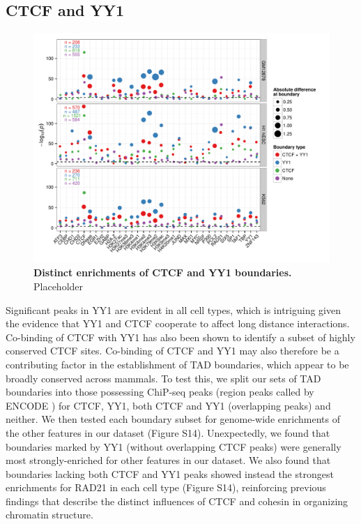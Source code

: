 \documentclass[a4paper,10pt,oneside]{book}
\begin{document}
\subsection{CTCF and YY1}

\begin{figure}
\begin{center} 
\includegraphics[width=1.2\textwidth]{figs/ctcfyy1.pdf}
\captionsetup{width=\textwidth}
\caption{ {\bf Distinct enrichments of CTCF and YY1 boundaries.}
Placeholder
}\label{fig:ctcfyy1}
\end{center}
\end{figure} 

Significant peaks in YY1 are evident in all cell
types, which is intriguing given the evidence that YY1 and CTCF
cooperate to affect long distance interactions.\cite{Atchison2014} Co-binding of CTCF with YY1 has also been shown
to identify a subset of highly conserved CTCF sites.\cite{Schwalie2013} Co-binding of CTCF and YY1 may also therefore be
a contributing factor in the establishment of TAD boundaries, which
appear to be broadly conserved across mammals.\cite{Dixon2012} To
test this, we split our sets of TAD boundaries into those possessing
ChiP-seq peaks (region peaks called by ENCODE \cite{Dunham2012}) for
CTCF, YY1, both CTCF and YY1 (overlapping peaks) and neither. We then
tested each boundary subset for genome-wide enrichments of the other
features in our dataset (Figure S14). Unexpectedly, we found that
boundaries marked by YY1 (without overlapping CTCF peaks) were
generally most strongly-enriched for other features in our dataset. We
also found that boundaries lacking both CTCF and YY1 peaks showed
instead the strongest enrichments for RAD21 in each cell type (Figure
S14), reinforcing previous findings that describe the distinct
influences of CTCF and cohesin in organizing chromatin structure.\cite{Zuin2013, Seitan2013, Phillips-Cremins2013}
\end{document}
